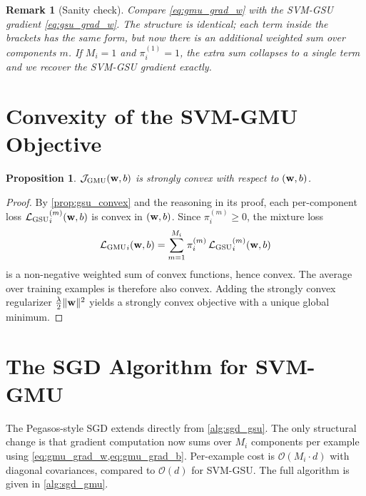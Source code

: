 \documentclass[11pt, letterpaper]{article}
\newcommand{\loss}{\mathcal{L}}
\newcommand{\obj}{\mathcal{J}}
\newtheorem{proposition}[theorem]{Proposition}
\newtheorem{remark}{Remark}[section]
\begin{document}
\begin{remark}[Sanity check]
Compare \cref{eq:gmu_grad_w} with the SVM-GSU gradient \cref{eq:gsu_grad_w}. The structure is identical; each term inside the brackets has the same form, but now there is an additional weighted sum over components $m$. If $M_i = 1$ and $\pi_i^{(1)} = 1$, the extra sum collapses to a single term and we recover the SVM-GSU gradient exactly.
\end{remark}

\section{Convexity of the SVM-GMU Objective}\label{sec:gmu_convexity}

\begin{proposition}
$\obj_{\text{GMU}}(\vb{w}, b)$ is strongly convex with respect to $(\vb{w}, b)$.
\end{proposition}

\begin{proof}
By \cref{prop:gsu_convex} and the reasoning in its proof, each per-component loss ${\loss_{\text{GSU}}}_{i}^{(m)}(\vb{w}, b)$ is convex in $(\vb{w}, b)$. Since $\pi_i^{(m)} \geq 0$, the mixture loss
\begin{equation}
    {\loss_{\text{GMU}}}_{i}(\vb{w}, b) = \sum_{m=1}^{M_i}\pi_i^{(m)}\,{\loss_{\text{GSU}}}_{i}^{(m)}(\vb{w}, b)
\end{equation}
is a non-negative weighted sum of convex functions, hence convex. The average over training examples is therefore also convex. Adding the strongly convex regularizer $\frac{\lambda}{2}\|\vb{w}\|^2$ yields a strongly convex objective with a unique global minimum.
\end{proof}

\section{The SGD Algorithm for SVM-GMU}\label{sec:gmu_sgd}

The Pegasos-style SGD extends directly from \cref{alg:sgd_gsu}. The only structural change is that gradient computation now sums over $M_i$ components per example using \cref{eq:gmu_grad_w,eq:gmu_grad_b}. Per-example cost is $\mathcal{O}(M_i \cdot d)$ with diagonal covariances, compared to $\mathcal{O}(d)$ for SVM-GSU. The full algorithm is given in \cref{alg:sgd_gmu}.
\end{document}
